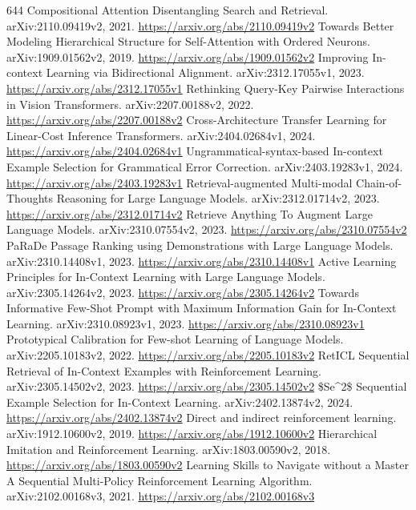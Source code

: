\documentclass[11pt]{article}
\begin{document}
\begin{thebibliography}{644}
 Compositional Attention Disentangling Search and Retrieval. arXiv:2110.09419v2, 2021. \url{https://arxiv.org/abs/2110.09419v2}
 Towards Better Modeling Hierarchical Structure for Self-Attention with Ordered Neurons. arXiv:1909.01562v2, 2019. \url{https://arxiv.org/abs/1909.01562v2}
 Improving In-context Learning via Bidirectional Alignment. arXiv:2312.17055v1, 2023. \url{https://arxiv.org/abs/2312.17055v1}
 Rethinking Query-Key Pairwise Interactions in Vision Transformers. arXiv:2207.00188v2, 2022. \url{https://arxiv.org/abs/2207.00188v2}
 Cross-Architecture Transfer Learning for Linear-Cost Inference Transformers. arXiv:2404.02684v1, 2024. \url{https://arxiv.org/abs/2404.02684v1}
 Ungrammatical-syntax-based In-context Example Selection for Grammatical Error Correction. arXiv:2403.19283v1, 2024. \url{https://arxiv.org/abs/2403.19283v1}
 Retrieval-augmented Multi-modal Chain-of-Thoughts Reasoning for Large Language Models. arXiv:2312.01714v2, 2023. \url{https://arxiv.org/abs/2312.01714v2}
 Retrieve Anything To Augment Large Language Models. arXiv:2310.07554v2, 2023. \url{https://arxiv.org/abs/2310.07554v2}
 PaRaDe Passage Ranking using Demonstrations with Large Language Models. arXiv:2310.14408v1, 2023. \url{https://arxiv.org/abs/2310.14408v1}
 Active Learning Principles for In-Context Learning with Large Language Models. arXiv:2305.14264v2, 2023. \url{https://arxiv.org/abs/2305.14264v2}
 Towards Informative Few-Shot Prompt with Maximum Information Gain for In-Context Learning. arXiv:2310.08923v1, 2023. \url{https://arxiv.org/abs/2310.08923v1}
 Prototypical Calibration for Few-shot Learning of Language Models. arXiv:2205.10183v2, 2022. \url{https://arxiv.org/abs/2205.10183v2}
 RetICL Sequential Retrieval of In-Context Examples with Reinforcement Learning. arXiv:2305.14502v2, 2023. \url{https://arxiv.org/abs/2305.14502v2}
 \$Se\textasciicircum{}2\$ Sequential Example Selection for In-Context Learning. arXiv:2402.13874v2, 2024. \url{https://arxiv.org/abs/2402.13874v2}
 Direct and indirect reinforcement learning. arXiv:1912.10600v2, 2019. \url{https://arxiv.org/abs/1912.10600v2}
 Hierarchical Imitation and Reinforcement Learning. arXiv:1803.00590v2, 2018. \url{https://arxiv.org/abs/1803.00590v2}
 Learning Skills to Navigate without a Master A Sequential Multi-Policy Reinforcement Learning Algorithm. arXiv:2102.00168v3, 2021. \url{https://arxiv.org/abs/2102.00168v3}

\end{thebibliography}
\end{document}
